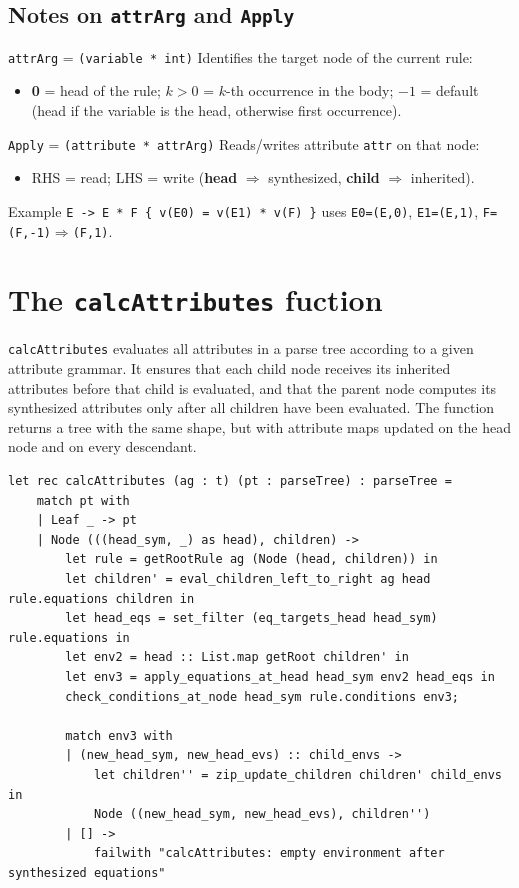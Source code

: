 \subsection*{Notes on \texttt{attrArg} and \texttt{Apply}}

\texttt{attrArg} = \texttt{(variable * int)} Identifies the target node of the current rule:
\begin{itemize}
  \item \textbf{0} = head of the rule; \quad \textbf{$k>0$} = $k$-th occurrence in the body; \quad \textbf{$-1$} = default (head if the variable is the head, otherwise first occurrence).
\end{itemize}

\texttt{Apply} = \texttt{(attribute * attrArg)} Reads/writes attribute \texttt{attr} on that node:
\begin{itemize}
  \item RHS = read; \quad LHS = write (\textbf{head} $\Rightarrow$ synthesized, \textbf{child} $\Rightarrow$ inherited).
\end{itemize}

Example
\texttt{E -> E * F \{ v(E0) = v(E1) * v(F) \}} uses \texttt{E0=(E,0)}, \texttt{E1=(E,1)}, \texttt{F=(F,-1)$\Rightarrow$(F,1)}.




\section{The \texttt{calcAttributes} fuction} 

\texttt{calcAttributes} evaluates all attributes in a parse tree according to a given attribute grammar. 
It ensures that each child node receives its inherited attributes before that child is evaluated, and that the parent node computes its synthesized attributes 
only after all children have been evaluated. 
The function returns a tree with the same shape, but with attribute maps updated on the head node and on every descendant. 


\begin{verbatim}
let rec calcAttributes (ag : t) (pt : parseTree) : parseTree =
    match pt with
    | Leaf _ -> pt
    | Node (((head_sym, _) as head), children) ->
        let rule = getRootRule ag (Node (head, children)) in
        let children' = eval_children_left_to_right ag head rule.equations children in
        let head_eqs = set_filter (eq_targets_head head_sym) rule.equations in
        let env2 = head :: List.map getRoot children' in
        let env3 = apply_equations_at_head head_sym env2 head_eqs in
        check_conditions_at_node head_sym rule.conditions env3;

        match env3 with
        | (new_head_sym, new_head_evs) :: child_envs ->
            let children'' = zip_update_children children' child_envs in
            Node ((new_head_sym, new_head_evs), children'')
        | [] ->
            failwith "calcAttributes: empty environment after synthesized equations"
\end{verbatim}


